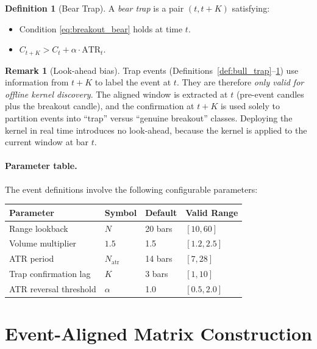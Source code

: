 \documentclass[11pt,a4paper]{article}
\theoremstyle{definition}
\newtheorem{definition}{Definition}[section]
\newtheorem{remark}{Remark}[section]
\theoremstyle{plain}
\begin{document}
\begin{definition}[Bear Trap]
\label{def:bear_trap}
A \emph{bear trap} is a pair $(t, t+K)$ satisfying:
\begin{itemize}
    \item[(i)] Condition \eqref{eq:breakout_bear} holds at time $t$.
    \item[(ii)] $C_{t+K} > C_t + \alpha \cdot \mathrm{ATR}_t$.
\end{itemize}
\end{definition}

\begin{remark}[Look-ahead bias]
\label{rem:lookahead}
Trap events (Definitions~\ref{def:bull_trap}--\ref{def:bear_trap}) use information from
$t+K$ to label the event at $t$. They are therefore \emph{only valid for offline kernel
discovery}. The aligned window is extracted at $t$ (pre-event candles plus the breakout
candle), and the confirmation at $t+K$ is used solely to partition events into ``trap''
versus ``genuine breakout'' classes. Deploying the kernel in real time introduces no
look-ahead, because the kernel is applied to the current window at bar $t$.
\end{remark}

\paragraph{Parameter table.}
The event definitions involve the following configurable parameters:
\begin{center}
\begin{tabular}{llll}
\hline
\textbf{Parameter} & \textbf{Symbol} & \textbf{Default} & \textbf{Valid Range} \\
\hline
Range lookback           & $N$                   & 20 bars   & $[10, 60]$ \\
Volume multiplier        & $1.5$                 & 1.5       & $[1.2, 2.5]$ \\
ATR period               & $N_{\mathrm{atr}}$    & 14 bars   & $[7, 28]$ \\
Trap confirmation lag    & $K$                   & 3 bars    & $[1, 10]$ \\
ATR reversal threshold   & $\alpha$              & 1.0       & $[0.5, 2.0]$ \\
\hline
\end{tabular}
\end{center}

\section{Event-Aligned Matrix Construction}
\label{sec:matrix}
\end{document}
